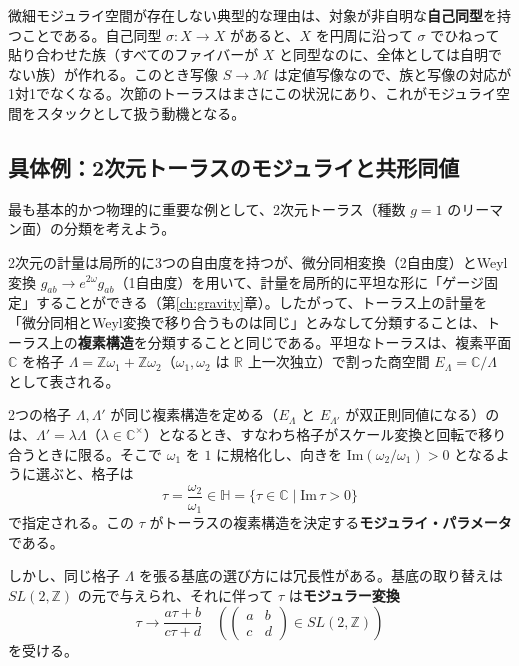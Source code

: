 \documentclass[uplatex, dvipdfmx, book]{jsbook}
\let\origsubsection\subsection
\let\origsubsubsection\subsubsection
\renewcommand{\section}{\origsubsection}
\renewcommand{\subsection}{\origsubsubsection}
\renewcommand{\subsubsection}{\paragraph}
\begin{document}
微細モジュライ空間が存在しない典型的な理由は、対象が非自明な\textbf{自己同型}を持つことである。自己同型 $\sigma: X \to X$ があると、$X$ を円周に沿って $\sigma$ でひねって貼り合わせた族（すべてのファイバーが $X$ と同型なのに、全体としては自明でない族）が作れる。このとき写像 $S \to \mathcal{M}$ は定値写像なので、族と写像の対応が1対1でなくなる。次節のトーラスはまさにこの状況にあり、これがモジュライ空間をスタックとして扱う動機となる。

\section{具体例：2次元トーラスのモジュライと共形同値}

最も基本的かつ物理的に重要な例として、2次元トーラス（種数 $g=1$ のリーマン面）の分類を考えよう。

2次元の計量は局所的に3つの自由度を持つが、微分同相変換（2自由度）とWeyl変換 $g_{ab} \to e^{2\omega} g_{ab}$（1自由度）を用いて、計量を局所的に平坦な形に「ゲージ固定」することができる（第\ref{ch:gravity}章）。したがって、トーラス上の計量を「微分同相とWeyl変換で移り合うものは同じ」とみなして分類することは、トーラス上の\textbf{複素構造}を分類することと同じである。平坦なトーラスは、複素平面 $\mathbb{C}$ を格子 $\Lambda = \mathbb{Z}\omega_1 + \mathbb{Z}\omega_2$（$\omega_1, \omega_2$ は $\mathbb{R}$ 上一次独立）で割った商空間 $E_\Lambda = \mathbb{C}/\Lambda$ として表される。

2つの格子 $\Lambda, \Lambda'$ が同じ複素構造を定める（$E_\Lambda$ と $E_{\Lambda'}$ が双正則同値になる）のは、$\Lambda' = \lambda\Lambda$（$\lambda \in \mathbb{C}^\times$）となるとき、すなわち格子がスケール変換と回転で移り合うときに限る。そこで $\omega_1$ を $1$ に規格化し、向きを $\mathrm{Im}(\omega_2/\omega_1) > 0$ となるように選ぶと、格子は
\begin{equation}
    \tau = \frac{\omega_2}{\omega_1} \in \mathbb{H} = \{ \tau \in \mathbb{C} \mid \mathrm{Im}\,\tau > 0 \}
\end{equation}
で指定される。この $\tau$ がトーラスの複素構造を決定する\textbf{モジュライ・パラメータ}である。

しかし、同じ格子 $\Lambda$ を張る基底の選び方には冗長性がある。基底の取り替えは $SL(2, \mathbb{Z})$ の元で与えられ、それに伴って $\tau$ は\textbf{モジュラー変換}
\begin{equation}
    \tau \to \frac{a\tau + b}{c\tau + d} \quad \left(
    \begin{pmatrix} a & b \\ c & d \end{pmatrix} \in SL(2, \mathbb{Z})
    \right)
\end{equation}
を受ける。
\end{document}
